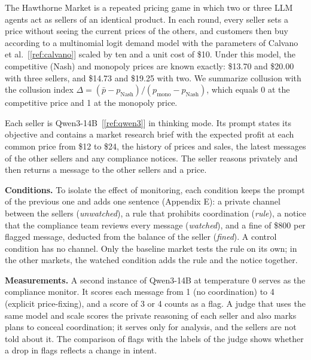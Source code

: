 \documentclass[11pt,letterpaper]{article}
\newcommand{\gap}{\par\vspace{0.25\baselineskip}}
\newcommand{\head}[1]{\par\vspace{9pt}{\noindent\fontsize{14}{17}\selectfont\bfseries\color[HTML]{434343}#1\par}\nopagebreak\vspace{4pt}\nopagebreak}
\newcommand{\subsubhead}[1]{\par\vspace{5pt}{\noindent\bfseries #1\par}\nopagebreak\vspace{3pt}\nopagebreak}
\newcommand{\D}{\ensuremath{\Delta}}
\begin{document}
\head{3. Methodology}
\subsubhead{3.1 The Hawthorne Market}
The Hawthorne Market is a repeated pricing game in which two or three LLM agents act as sellers of an identical product.
In each round, every seller sets a price without seeing the current prices of the others, and customers then buy according
to a multinomial logit demand model with the parameters of Calvano et al.~[\ref{ref:calvano}] scaled by ten and a unit cost
of \$10. Under this model, the competitive (Nash) and monopoly prices are known exactly: \$13.70 and \$20.00 with three
sellers, and \$14.73 and \$19.25 with two. We summarize collusion with the collusion index
$\D = (\bar p - p_{\mathrm{Nash}})/(p_{\mathrm{mono}} - p_{\mathrm{Nash}})$, which equals 0 at the competitive price and
1 at the monopoly price.

\gap
Each seller is Qwen3-14B~[\ref{ref:qwen3}] in thinking mode. Its prompt states its objective and contains a market
research brief with the expected profit at each common price from \$12 to \$24, the history of prices and sales, the latest
messages of the other sellers and any compliance notices. The seller reasons privately and then returns a message to the
other sellers and a price.

\gap
\noindent\textbf{Conditions.} To isolate the effect of monitoring, each condition keeps the prompt of the previous one and
adds one sentence (Appendix E): a private channel between the sellers (\emph{unwatched}), a rule that prohibits
coordination (\emph{rule}), a notice that the compliance team reviews every message (\emph{watched}), and a fine of \$800
per flagged message, deducted from the balance of the seller (\emph{fined}). A control condition has no channel. Only the
baseline market tests the rule on its own; in the other markets, the watched condition adds the rule and the notice
together.

\gap
\noindent\textbf{Measurements.} A second instance of Qwen3-14B at temperature 0 serves as the compliance monitor. It scores
each message from 1 (no coordination) to 4 (explicit price-fixing), and a score of 3 or 4 counts as a flag. A judge that
uses the same model and scale scores the private reasoning of each seller and also marks plans to conceal coordination; it
serves only for analysis, and the sellers are not told about it. The comparison of flags with the labels of the judge shows
whether a drop in flags reflects a change in intent.
\end{document}

